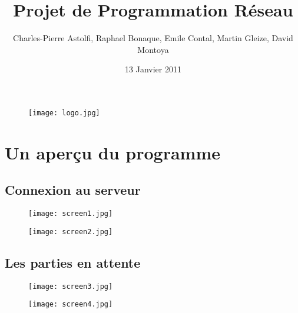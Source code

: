 \documentclass{beamer}
\title[Programmation Réseau]{Projet de Programmation Réseau}
\author[Emile CONTAL]{Charles-Pierre Astolfi, Raphael Bonaque, Emile Contal, Martin Gleize, David Montoya}
\date{13 Janvier 2011}
\begin{document}
\begin{frame}
  \titlepage
  \begin{figure}[H]
    \begin{center}
      \texttt{[image: logo.jpg]}
    \end{center}
  \end{figure}
\end{frame}


\section{Un aperçu du programme}
\subsection{Connexion au serveur}
\begin{frame}
  \begin{figure}[H]
    \begin{center}
      \texttt{[image: screen1.jpg]}
    \end{center}
  \end{figure}
\end{frame}

\begin{frame}
  \begin{figure}[H]
    \begin{center}
      \texttt{[image: screen2.jpg]}
    \end{center}
  \end{figure}
\end{frame}

\subsection{Les parties en attente}
\begin{frame}
  \begin{figure}[H]
    \begin{center}
      \texttt{[image: screen3.jpg]}
    \end{center}
  \end{figure}
\end{frame}

\begin{frame}
  \begin{figure}[H]
    \begin{center}
      \texttt{[image: screen4.jpg]}
    \end{center}
  \end{figure}
\end{frame}
\end{document}
